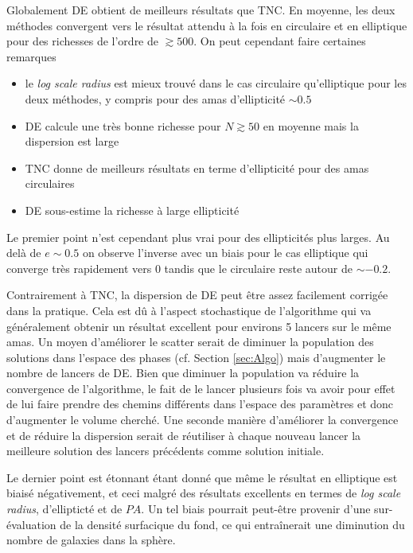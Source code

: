 \documentclass[a4paper,11pt]{article}
\numberwithin{equation}{section}
\begin{document}
    Globalement DE obtient de meilleurs résultats que TNC. En moyenne, les deux méthodes convergent vers le résultat attendu à la fois en circulaire et en elliptique pour des richesses de l'ordre de $\gtrsim 500$. On peut cependant faire certaines remarques
  
    \begin{itemize}
      \item le \textit{log scale radius} est mieux trouvé dans le cas circulaire qu'elliptique pour les deux méthodes, y compris pour des amas d'ellipticité $\sim 0.5$
      \item DE calcule une très bonne richesse pour $N \gtrsim 50$ en moyenne mais la dispersion est large
      \item TNC donne de meilleurs résultats en terme d'ellipticité pour des amas circulaires
      \item DE sous-estime la richesse à large ellipticité
    \end{itemize}
  
    Le premier point n'est cependant plus vrai pour des ellipticités plus larges. Au delà de $e \sim 0.5$ on observe l'inverse avec un biais pour le cas elliptique qui converge très rapidement vers 0 tandis que le circulaire reste autour de $\sim -0.2$. \par
    Contrairement à TNC, la dispersion de DE peut être assez facilement corrigée dans la pratique. Cela est dû à l'aspect stochastique de l'algorithme qui va généralement obtenir un résultat excellent pour environs 5 lancers sur le même amas. Un moyen d'améliorer le scatter serait de diminuer la population des solutions dans l'espace des phases (cf. Section \ref{sec:Algo}) mais d'augmenter le nombre de lancers de DE. Bien que diminuer la population va réduire la convergence de l'algorithme, le fait de le lancer plusieurs fois va avoir pour effet de lui faire prendre des chemins différents dans l'espace des paramètres et donc d'augmenter le volume cherché. Une seconde manière d'améliorer la convergence et de réduire la dispersion serait de réutiliser à chaque nouveau lancer la meilleure solution des lancers précédents comme solution initiale.\par
    Le dernier point est étonnant étant donné que même le résultat en elliptique est biaisé négativement, et ceci malgré des résultats excellents en termes de \textit{log scale radius}, d'ellipticté et de $PA$. Un tel biais pourrait peut-être provenir d'une sur-évaluation de la densité surfacique du fond, ce qui entraînerait une diminution du nombre de galaxies dans la sphère.  
  
\end{document}
